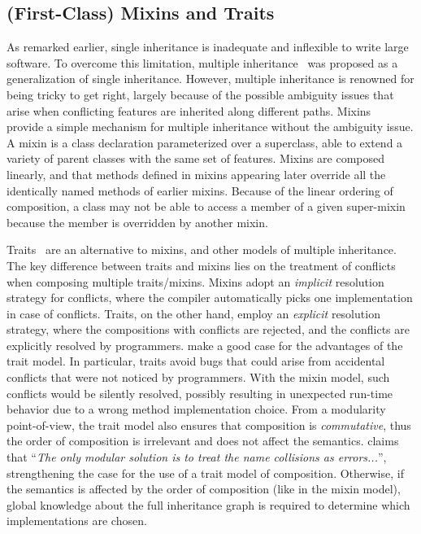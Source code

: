 \subsection{(First-Class) Mixins and Traits}

As remarked earlier, single inheritance is inadequate and inflexible to write
large software. To overcome this limitation, multiple
inheritance~\citep{cardelli1984semantics} was proposed as a generalization of
single inheritance. However, multiple inheritance is renowned for being tricky
to get right, largely because of the possible ambiguity issues that arise when
conflicting features are inherited along different paths.
Mixins~\citep{bracha1990mixin} provide a simple mechanism for multiple
inheritance without the ambiguity issue. A mixin is a class declaration
parameterized over a superclass, able to extend a variety of parent classes with
the same set of features. Mixins are composed linearly, and that methods defined
in mixins appearing later override all the identically named methods of earlier
mixins. Because of the linear ordering of composition, a class may not be able
to access a member of a given super-mixin because the member is overridden by
another mixin.

Traits~\citep{scharli2003traits, Ducasse_2006} are an alternative to mixins, and
other models of multiple inheritance. The key difference between traits and
mixins lies on the treatment of conflicts when composing multiple traits/mixins.
Mixins adopt an \emph{implicit} resolution strategy for conflicts, where the
compiler automatically picks one implementation in case of conflicts. Traits, on
the other hand, employ an \emph{explicit} resolution strategy, where the
compositions with conflicts are rejected, and the conflicts are explicitly
resolved by programmers. \citet{scharli2003traits} make a good case for the
advantages of the trait model. In particular, traits avoid bugs that could arise
from accidental conflicts that were not noticed by programmers. With the mixin
model, such conflicts would be silently resolved, possibly resulting in
unexpected run-time behavior due to a wrong method implementation choice. From a
modularity point-of-view, the trait model also ensures that composition is
\emph{commutative}, thus the order of composition is irrelevant and does not
affect the semantics. \citet{bracha1992programming} claims that ``\emph{The only
  modular solution is to treat the name collisions as errors...}'',
strengthening the case for the use of a trait model of composition. Otherwise,
if the semantics is affected by the order of composition (like in the mixin model), global knowledge about
the full inheritance graph is required to determine which implementations are
chosen.

